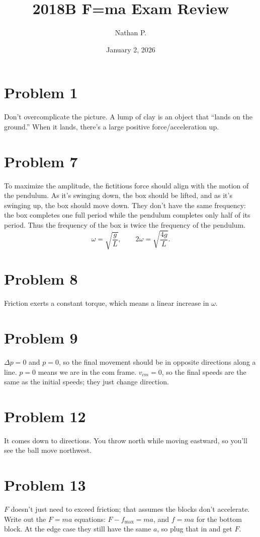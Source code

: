 \documentclass[11pt]{article}
\title{2018B F=ma Exam Review}
\author{Nathan P.}
\date{January 2, 2026}
\begin{document}
\maketitle

\section*{Problem 1}
Don't overcomplicate the picture. A lump of clay is an object that ``lands on the ground.'' When it lands, there's a large positive force/acceleration up.

\section*{Problem 7}
To maximize the amplitude, the fictitious force should align with the motion of the pendulum. As it's swinging down, the box should be lifted, and as it's swinging up, the box should move down. They don't have the same frequency: the box completes one full period while the pendulum completes only half of its period. Thus the frequency of the box is twice the frequency of the pendulum.
\[
\omega=\sqrt{\frac gL},\qquad 2\omega=\sqrt{\frac{4g}{L}}.
\]

\section*{Problem 8}
Friction exerts a constant torque, which means a linear increase in $\omega$.

\section*{Problem 9}
$\Delta p=0$ and $p=0$, so the final movement should be in opposite directions along a line.
$p=0$ means we are in the com frame. $v_{cm}=0$, so the final speeds are the same as the initial speeds; they just change direction.

\section*{Problem 12}
It comes down to directions. You throw north while moving eastward, so you'll see the ball move northwest.

\section*{Problem 13}
$F$ doesn't just need to exceed friction; that assumes the blocks don't accelerate.
Write out the $F=ma$ equations: $F-f_{\max}=ma$, and $f=ma$ for the bottom block.
At the edge case they still have the same $a$, so plug that in and get $F$.
\end{document}
